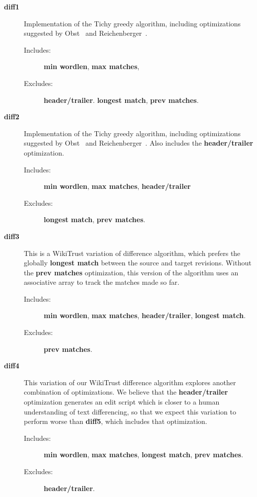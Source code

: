 \begin{description}

\item[\textbf{diff1}]
    Implementation of the Tichy greedy algorithm, including optimizations
    suggested by Obst~\cite{Obst1987} and
    Reichenberger~\cite{Reichenberger1991}.
    \begin{description}
    \item[Includes:]
        \textbf{min wordlen}, \textbf{max matches},
    \item[Excludes:]
        \textbf{header/trailer}.
        \textbf{longest match}, \textbf{prev matches}.
    \end{description}

\item[\textbf{diff2}]
    Implementation of the Tichy greedy algorithm, including optimizations
    suggested by Obst~\cite{Obst1987} and
    Reichenberger~\cite{Reichenberger1991}.
    Also includes the \textbf{header/trailer} optimization.
    \begin{description}
    \item[Includes:]
        \textbf{min wordlen}, \textbf{max matches}, \textbf{header/trailer}
    \item[Excludes:]
        \textbf{longest match}, \textbf{prev matches}.
    \end{description}

\item[\textbf{diff3}]
    This is a WikiTrust variation of difference algorithm, which prefers
    the globally \textbf{longest match} between the source and target
    revisions.
    Without the \textbf{prev matches} optimization, this version of the algorithm
    uses an associative array to track the matches made so far.
    \begin{description}
    \item[Includes:]
	\textbf{min wordlen}, \textbf{max matches},
	\textbf{header/trailer}, \textbf{longest match}.
    \item[Excludes:]
	\textbf{prev matches}.
    \end{description}

\item[\textbf{diff4}]
    This variation of our WikiTrust difference algorithm explores another
    combination of optimizations.
    We believe that the \textbf{header/trailer} optimization generates
    an edit script which is closer to a human understanding of text
    differencing, so that we expect this variation to perform worse
    than \textbf{diff5}, which includes that optimization.
    \begin{description}
    \item[Includes:]
	\textbf{min wordlen}, \textbf{max matches}, \textbf{longest match},
	\textbf{prev matches}.
    \item[Excludes:]
	\textbf{header/trailer}.
    \end{description}


\end{description}
